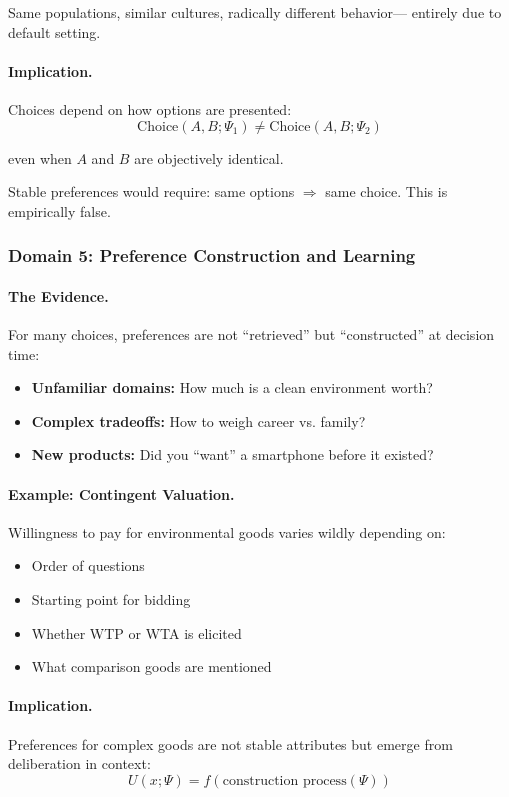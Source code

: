 \documentclass[12pt,a4paper]{article}
\begin{document}
Same populations, similar cultures, radically different behavior---
entirely due to default setting.

\paragraph{Implication.}
Choices depend on how options are presented:
\begin{equation}
  \text{Choice}(A, B; \Psi_1) \neq \text{Choice}(A, B; \Psi_2)
\end{equation}

even when $A$ and $B$ are objectively identical.

Stable preferences would require: same options $\Rightarrow$ same choice.
This is empirically false.

\subsubsection{Domain 5: Preference Construction and Learning}

\paragraph{The Evidence.}
For many choices, preferences are not ``retrieved'' but ``constructed'' at decision time:
\begin{itemize}
  \item \textbf{Unfamiliar domains:} How much is a clean environment worth?
  \item \textbf{Complex tradeoffs:} How to weigh career vs. family?
  \item \textbf{New products:} Did you ``want'' a smartphone before it existed?
\end{itemize}

\paragraph{Example: Contingent Valuation.}
Willingness to pay for environmental goods varies wildly depending on:
\begin{itemize}
  \item Order of questions
  \item Starting point for bidding
  \item Whether WTP or WTA is elicited
  \item What comparison goods are mentioned
\end{itemize}

\paragraph{Implication.}
Preferences for complex goods are not stable attributes
but emerge from deliberation in context:
\begin{equation}
  U(x; \Psi) = f(\text{construction process}(\Psi))
\end{equation}
\end{document}
